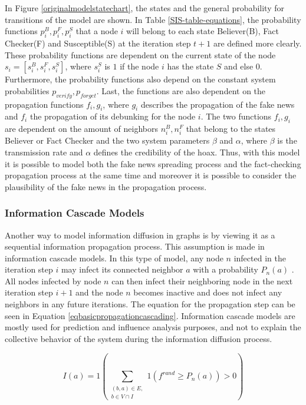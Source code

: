 In Figure \ref{originalmodelstatechart}, the states and the general probability
for transitions of the model are shown.
In Table \ref{SIS-table-equations}, the probability functions 
$p_i^B,  p_i^F,  p_i^S$ that a node $i$ will belong to each state  
\glqq Believer\grqq{}(B), \glqq Fact Checker\grqq{}(F) and 
\glqq Susceptible\grqq{}(S) at the iteration step $t+1$ are defined more clearly. 
These probability functions 
are dependent on the current state of the node $s_i=[s_i^B,  s_i^F,  s_i^S]$,
where $s_i^S$ is $1$ if the node $i$ has the state $S$ and else $0$.
Furthermore, the probability functions also depend on the constant system 
probabilities $p_{verify}, p_{forget}$. Last, the functions are also 
dependent on the propagation functions $f_i, g_i$, where $g_i$ describes 
the propagation of the fake news and $f_i$ the propagation of its debunking
for the node $i$. The two functions  $f_i, g_i$ are dependent on
the amount of neighbors $n_i^B, n_i^F$ that belong to the states
\glqq Believer\grqq{} or \glqq Fact Checker\grqq{} and the two 
system parameters $\beta$ and $\alpha$, where $\beta$ is the transmission rate
and $\alpha$ defines the credibility of the hoax. Thus, with this model it
is possible to model both the fake news spreading process and 
the fact-checking propagation process at the same time and
moreover it is possible to consider the plausibility of the fake 
news in the propagation process.

\subsubsection{Information Cascade Models}

Another way to model information diffusion in graphs is by viewing it as a 
sequential information propagation process. This assumption is made in
information cascade models. In this type of model, any node $n$ infected in the
iteration step $i$ may infect its connected neighbor $a$ with a probability $P_n(a)$
\cite{reviewinformationdiffusion}. All nodes infected by node $n$
can then infect their neighboring node in the next iteration step $i+1$
and the node $n$ becomes inactive and does not infect any neighbors in any future
iterations.
The equation for the propagation step can be seen in Equation 
\ref{eqbasicpropagationcascading}.
Information cascade models are mostly used for prediction and influence 
analysis purposes, and not to explain the collective behavior
of the system during the information diffusion process.

\begin{equation}
    I(a) = 1 (\sum\limits_{\substack{(b,a)\in E, \\ b \in V \cap I}}
    1(f^{rand}\geq P_n(a))>0) 
    \label{eqbasicpropagationcascading}
\end{equation}

